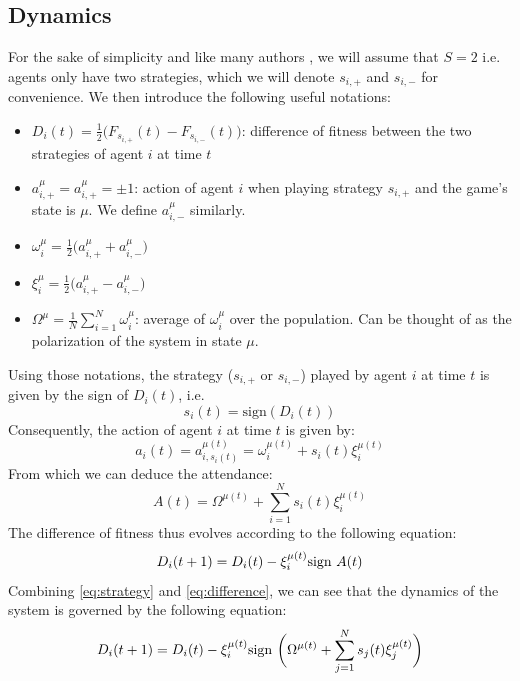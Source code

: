\documentclass[a4paper, amsfonts, amssymb, amsmath, reprint, showkeys, nofootinbib, twoside]{revtex4-1}
\begin{document}
\subsection{Dynamics}
For the sake of simplicity and like many authors \cite{Challet_1997}, we will assume that $S=2$ i.e. agents only have two strategies, which we will denote $s_{i,+}$ and $s_{i,-}$ for convenience. We then introduce the following useful notations:
\begin{itemize}
    \item $D_i(t) = \frac{1}{2}\big(F_{s_{i,+}}(t) - F_{s_{i,-}}(t)\big)$: difference of fitness between the two strategies of agent $i$ at time $t$
    \item $a_{i,+}^\mu = a_{i,+}^\mu = \pm 1$: action of agent $i$ when playing strategy $s_{i,+}$ and the game's state is $\mu$. We define $a_{i,-}^\mu$ similarly.
    \item $\omega_i^\mu = \frac{1}{2}\big(a_{i,+}^\mu + a_{i,-}^\mu\big)$
    \item $\xi_i^\mu = \frac{1}{2}\big(a_{i,+}^\mu - a_{i,-}^\mu\big)$
    \item $\Omega^\mu = \frac{1}{N} \sum_{i=1}^N \omega_i^\mu$: average of $\omega_i^\mu$ over the population. Can be thought of as the polarization of the system in state $\mu$.
\end{itemize}

Using those notations, the strategy ($s_{i,+}$ or $s_{i,-}$) played by agent $i$ at time $t$ is given by the sign of $D_i(t)$, i.e.
\begin{equation}
\label{eq:strategy}
    s_i(t) = \text{sign}(D_i(t))
\end{equation}
Consequently, the action of agent $i$ at time $t$ is given by:
\begin{equation}
    a_i(t) = a_{i,s_i(t)}^{\mu(t)} = \omega_i^{\mu(t)} + s_i(t) \xi_i^{\mu(t)}
\end{equation}
From which we can deduce the attendance:
\begin{equation}
    A(t) = \Omega^{\mu(t)} + \sum_{i=1}^N s_i(t) \xi_i^{\mu(t)}
\end{equation}
The difference of fitness thus evolves according to the following equation:
\begin{equation}
\label{eq:difference}
    D_i(t+1) = D_i(t) - \xi_i^{\mu(t)} \textnormal{sign }A(t)
\end{equation}
Combining \eqref{eq:strategy} and \eqref{eq:difference}, we can see that the dynamics of the system is governed by the following equation:
\begin{equation}
\label{eq:dynamics}
    D_i(t+1) = D_i(t) - \xi_i^{\mu(t)} \textnormal{sign }\bigg(\Omega^{\mu(t)} + \sum_{j=1}^N s_j(t) \xi_j^{\mu(t)}\bigg)
\end{equation}
\end{document}
